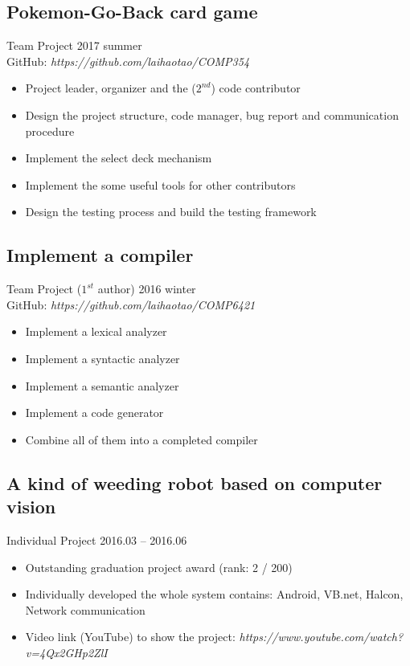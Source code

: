 \documentclass[11pt,a4paper,sans]{moderncv}
\begin{document}
\subsection{Pokemon-Go-Back card game}
Team Project \hfill 2017 summer \\
GitHub: {\textit{https://github.com/laihaotao/COMP354}}
\vspace{2pt}
\begin{itemize}
\item Project leader, organizer and the ($2^{nd}$) code contributor
\item Design the project structure, code manager, bug report and communication procedure
\item Implement the select deck mechanism
\item Implement the some useful tools for other contributors
\item Design the testing process and build the testing framework
\end{itemize}

\subsection{Implement a compiler}
Team Project ($1^{st}$ author) \hfill 2016 winter \\
GitHub: {\textit{https://github.com/laihaotao/COMP6421}}
\vspace{2pt}
\begin{itemize}
\item Implement a lexical analyzer
\item Implement a syntactic analyzer
\item Implement a semantic analyzer
\item Implement a code generator
\item Combine all of them into a completed compiler
\end{itemize}

\subsection{A kind of weeding robot based on computer vision}
Individual Project \hfill 2016.03 -- 2016.06
\vspace{2pt}
\begin{itemize}
\item Outstanding graduation project award (rank: 2 / 200)
\item Individually developed the whole system contains: Android, VB.net, Halcon, Network communication
\item Video link (YouTube) to show the project: {\textit{https://www.youtube.com/watch?v=4Qx2GHp2ZlI}}
\end{itemize}
\end{document}
